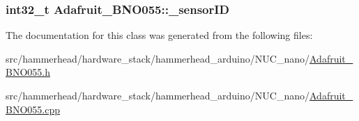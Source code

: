 \subsubsection[{\texorpdfstring{\+\_\+sensor\+ID}{_sensorID}}]{\setlength{\rightskip}{0pt plus 5cm}int32\+\_\+t Adafruit\+\_\+\+B\+N\+O055\+::\+\_\+sensor\+ID\hspace{0.3cm}{\ttfamily [private]}}\hypertarget{classAdafruit__BNO055_acc0316c669b1af8741e04e1aa63d1118}{}\label{classAdafruit__BNO055_acc0316c669b1af8741e04e1aa63d1118}


The documentation for this class was generated from the following files\+:\begin{DoxyCompactItemize}
\item 
src/hammerhead/hardware\+\_\+stack/hammerhead\+\_\+arduino/\+N\+U\+C\+\_\+nano/\hyperlink{Adafruit__BNO055_8h}{Adafruit\+\_\+\+B\+N\+O055.\+h}\item 
src/hammerhead/hardware\+\_\+stack/hammerhead\+\_\+arduino/\+N\+U\+C\+\_\+nano/\hyperlink{Adafruit__BNO055_8cpp}{Adafruit\+\_\+\+B\+N\+O055.\+cpp}\end{DoxyCompactItemize}
